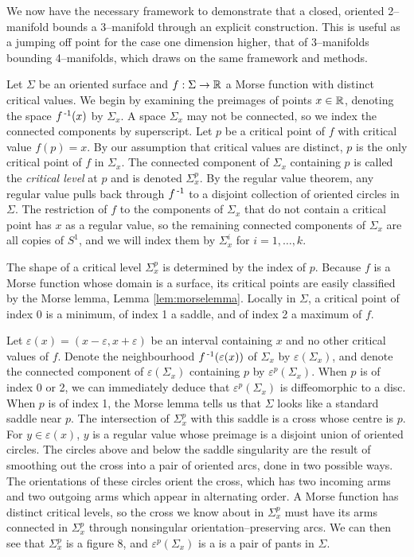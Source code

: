\label{sec:2bound3}

We now have the necessary framework to demonstrate that a closed, oriented 2--manifold bounds a 3--manifold through an explicit construction.
This is useful as a jumping off point for the case one dimension higher, that of 3--manifolds bounding 4--manifolds, which draws on the same framework and methods.

Let $\Sigma$ be an oriented surface and $f:\Sigma\to\mathbb{R}$ a Morse function with distinct critical values.
We begin by examining the preimages of points $x\in\mathbb{R}$, denoting the space $f^{\,\text{-}1}(x)$ by $\Sigma_x$.
A space $\Sigma_x$ may not be connected, so we index the connected components by superscript.
Let $p$ be a critical point of $f$ with critical value $f(p)=x$.
By our assumption that critical values are distinct, $p$ is the only critical point of $f$ in $\Sigma_x$.
The connected component of $\Sigma_x$ containing $p$ is called the \emph{critical level} at $p$ and is denoted $\Sigma_x^p$.
By the regular value theorem, any regular value pulls back through $f^{\,\text{-}1}$ to a disjoint collection of oriented circles in $\Sigma$.
The restriction of $f$ to the components of $\Sigma_x$ that do not contain a critical point has $x$ as a regular value, so the remaining connected components of $\Sigma_x$ are all copies of $S^1$, and we will index them by $\Sigma_x^i$ for $i=1,\dots,k$.

The shape of a critical level $\Sigma_x^p$ is determined by the index of $p$.
Because $f$ is a Morse function whose domain is a surface, its critical points are easily classified by the Morse lemma, Lemma \ref{lem:morselemma}.
Locally in $\Sigma$, a critical point of index 0 is a minimum, of index 1 a saddle, and of index 2 a maximum of $f$.

Let $\varepsilon(x)=(x-\varepsilon,x+\varepsilon)$ be an interval containing $x$ and no other critical values of $f$.
Denote the neighbourhood $f^{\,\text{-}1}(\varepsilon(x))$ of $\Sigma_x$ by $\varepsilon(\Sigma_x)$, and denote the connected component of $\varepsilon(\Sigma_x)$ containing $p$ by $\varepsilon^p(\Sigma_x)$.
When $p$ is of index 0 or 2, we can immediately deduce that $\varepsilon^p(\Sigma_x)$ is diffeomorphic to a disc.
When $p$ is of index 1, the Morse lemma tells us that $\Sigma$ looks like a standard saddle near $p$.
The intersection of $\Sigma_x^p$ with this saddle is a cross whose centre is $p$.
For $y\in\varepsilon(x)$, $y$ is a regular value whose preimage is a disjoint union of oriented circles.
The circles above and below the saddle singularity are the result of smoothing out the cross into a pair of oriented arcs, done in two possible ways.
The orientations of these circles orient the cross, which has two incoming arms and two outgoing arms which appear in alternating order.
A Morse function has distinct critical levels, so the cross we know about in $\Sigma_x^p$ must have its arms connected in $\Sigma_x^p$ through nonsingular orientation--preserving arcs.
We can then see that $\Sigma_x^p$ is a figure 8, and $\varepsilon^p(\Sigma_x)$ is a is a pair of pants in $\Sigma$.

